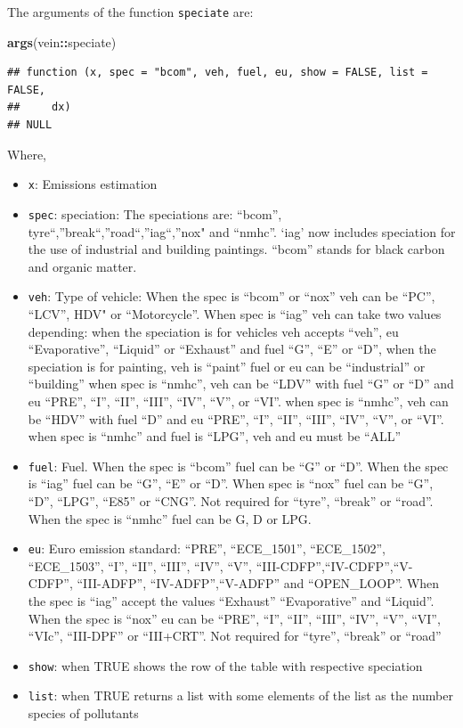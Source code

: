 \documentclass[12pt,graybox,envcountchap,sectrefs]{krantz}
\makeatletter
\newenvironment{Shaded}{\begin{snugshade}}{\end{snugshade}}
\newcommand{\KeywordTok}[1]{\textcolor[rgb]{0.13,0.29,0.53}{\textbf{#1}}}
\newcommand{\OperatorTok}[1]{\textcolor[rgb]{0.81,0.36,0.00}{\textbf{#1}}}
\newcommand{\NormalTok}[1]{#1}
\providecommand{\tightlist}{%
  \setlength{\itemsep}{0pt}\setlength{\parskip}{0pt}}
\newenvironment{kframe}{%
\medskip{}
\setlength{\fboxsep}{.8em}
 \def\at@end@of@kframe{}%
 \ifinner\ifhmode%
  \def\at@end@of@kframe{\end{minipage}}%
  \begin{minipage}{\columnwidth}%
 \fi\fi%
 \def\FrameCommand##1{\hskip\@totalleftmargin \hskip-\fboxsep
 \colorbox{shadecolor}{##1}\hskip-\fboxsep
     \hskip-\linewidth \hskip-\@totalleftmargin \hskip\columnwidth}%
 \MakeFramed {\advance\hsize-\width
   \@totalleftmargin\z@ \linewidth\hsize
   \@setminipage}}%
 {\par\unskip\endMakeFramed%
 \at@end@of@kframe}
\renewenvironment{Shaded}{\begin{kframe}}{\end{kframe}}
\theoremstyle{definition}
\theoremstyle{definition}
\theoremstyle{definition}
\theoremstyle{remark}
\makeatother
\begin{document}
The arguments of the function \texttt{speciate} are:

\begin{Shaded}
\begin{Highlighting}[]
\KeywordTok{args}\NormalTok{(vein}\OperatorTok{::}\NormalTok{speciate)}
\end{Highlighting}
\end{Shaded}

\begin{verbatim}
## function (x, spec = "bcom", veh, fuel, eu, show = FALSE, list = FALSE, 
##     dx) 
## NULL
\end{verbatim}

Where,

\begin{itemize}
\tightlist
\item
  \texttt{x}: Emissions estimation
\item
  \texttt{spec}: speciation: The speciations are: ``bcom'',
  tyre``,''break``,''road``,''iag``,''nox" and ``nmhc''. `iag' now
  includes speciation for the use of industrial and building paintings.
  ``bcom'' stands for black carbon and organic matter.
\item
  \texttt{veh}: Type of vehicle: When the spec is ``bcom'' or ``nox''
  veh can be ``PC'', ``LCV'', HDV" or ``Motorcycle''. When spec is
  ``iag'' veh can take two values depending: when the speciation is for
  vehicles veh accepts ``veh'', eu ``Evaporative'', ``Liquid'' or
  ``Exhaust'' and fuel ``G'', ``E'' or ``D'', when the speciation is for
  painting, veh is ``paint'' fuel or eu can be ``industrial'' or
  ``building'' when spec is ``nmhc'', veh can be ``LDV'' with fuel ``G''
  or ``D'' and eu ``PRE'', ``I'', ``II'', ``III'', ``IV'', ``V'', or
  ``VI''. when spec is ``nmhc'', veh can be ``HDV'' with fuel ``D'' and
  eu ``PRE'', ``I'', ``II'', ``III'', ``IV'', ``V'', or ``VI''. when
  spec is ``nmhc'' and fuel is ``LPG'', veh and eu must be ``ALL''
\item
  \texttt{fuel}: Fuel. When the spec is ``bcom'' fuel can be ``G'' or
  ``D''. When the spec is ``iag'' fuel can be ``G'', ``E'' or ``D''.
  When spec is ``nox'' fuel can be ``G'', ``D'', ``LPG'', ``E85'' or
  ``CNG''. Not required for ``tyre'', ``break'' or ``road''. When the
  spec is ``nmhc'' fuel can be G, D or LPG.
\item
  \texttt{eu}: Euro emission standard: ``PRE'', ``ECE\_1501'',
  ``ECE\_1502'', ``ECE\_1503'', ``I'', ``II'', ``III'', ``IV'', ``V'',
  ``III-CDFP'',``IV-CDFP'',``V-CDFP'', ``III-ADFP'',
  ``IV-ADFP'',``V-ADFP'' and ``OPEN\_LOOP''. When the spec is ``iag''
  accept the values ``Exhaust'' ``Evaporative'' and ``Liquid''. When the
  spec is ``nox'' eu can be ``PRE'', ``I'', ``II'', ``III'', ``IV'',
  ``V'', ``VI'', ``VIc'', ``III-DPF'' or ``III+CRT''. Not required for
  ``tyre'', ``break'' or ``road''
\item
  \texttt{show}: when TRUE shows the row of the table with respective
  speciation
\item
  \texttt{list}: when TRUE returns a list with some elements of the list
  as the number species of pollutants
\end{itemize}
\end{document}
